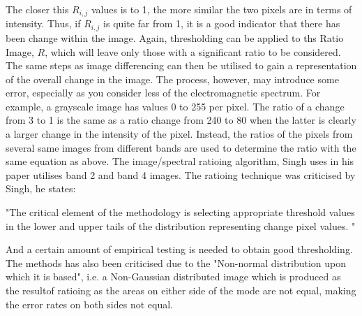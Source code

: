 \documentclass[11pt]{article}
\begin{document}
The closer this $R_{i,j}$ values is to 1, the more similar the two 
pixels are in terms of intensity. Thus, if $R_{i,j}$ is quite far from 
1, it is a good indicator that there has been change within the image.
Again, thresholding can be applied to ths Ratio Image, $R$, which will 
leave only those with a significant ratio to be considered. The same steps
as image differencing can then be utilised to gain a representation of the
overall change in the image. The process, however, may introduce some error,
especially as you consider less of the electromagnetic spectrum. For example,
a grayscale image has values 0 to 255 per pixel. The ratio of a change from
3 to 1 is the same as a ratio change from 240 to 80 when the latter is clearly
a larger change in the intensity of the pixel. Instead, the ratios of the
pixels from several same images from different bands are used to determine
the ratio with the same equation as above. The image/spectral ratioing
algorithm, Singh uses in his paper utilises band 2 and band 4 images. The 
ratioing technique was criticised by Singh, he states: \\
\begin{center}
"The critical element of the methodology is selecting appropriate threshold 
values in the lower and upper tails of the distribution representing change 
pixel values. "
\end{center}

And a certain amount of empirical testing is needed to obtain good thresholding.
The methods has also been criticised due to the "Non-normal distribution upon
which it is based", i.e. a Non-Gaussian distributed image which is produced as 
the resultof ratioing as the areas on either side of the mode are not equal, 
making the error rates on both sides not equal.
\end{document}
